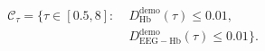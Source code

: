\documentclass{article}
\begin{document}
\fontsize{22}{29}\selectfont
\[
\begin{aligned}\mathcal C_\tau=\{\tau\in[0.5,8]:\;&D_{\mathrm{Hb}}^{\mathrm{demo}}(\tau)\leq 0.01,\\&D_{\mathrm{EEG-Hb}}^{\mathrm{demo}}(\tau)\leq 0.01\}.\end{aligned}
\]
\end{document}
